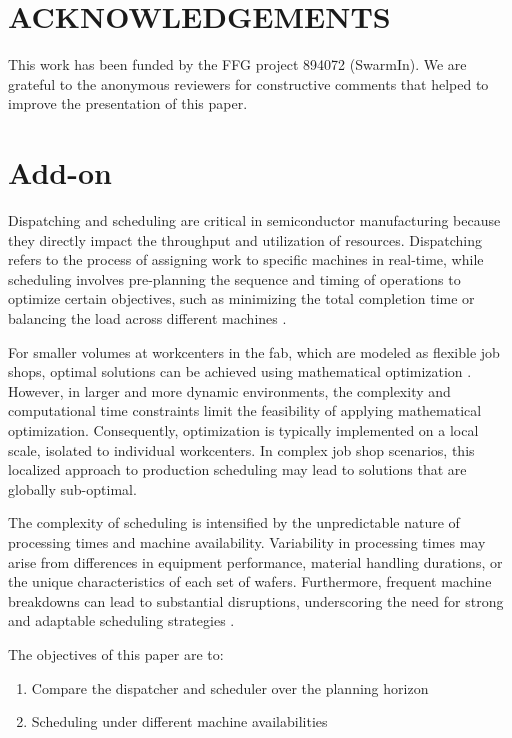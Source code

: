 \documentclass[runningheads]{llncs}
\begin{document}
\section*{ACKNOWLEDGEMENTS}

This work has been funded by the FFG project 894072 (SwarmIn).
We are grateful to the anonymous reviewers for constructive 
comments that helped to improve the presentation of this paper.

\section{Add-on}
Dispatching and scheduling are critical in semiconductor manufacturing because they directly impact the throughput and utilization of resources. Dispatching refers to the process of assigning work to specific machines in real-time, while scheduling involves pre-planning the sequence and timing of operations to optimize certain objectives, such as minimizing the total completion time or balancing the load across different machines \cite{schumann2022scheduling}.

For smaller volumes at workcenters in the fab, which are modeled as flexible job shops, optimal solutions can be achieved using mathematical optimization \cite{waschneck2018deep}. However, in larger and more dynamic environments, the complexity and computational time constraints limit the feasibility of applying mathematical optimization. Consequently, optimization is typically implemented on a local scale, isolated to individual workcenters. In complex job shop scenarios, this localized approach to production scheduling may lead to solutions that are globally sub-optimal.

The complexity of scheduling is intensified by the unpredictable nature of processing times and machine availability. Variability in processing times may arise from differences in equipment performance, material handling durations, or the unique characteristics of each set of wafers. Furthermore, frequent machine breakdowns can lead to substantial disruptions, underscoring the need for strong and adaptable scheduling strategies \cite{leachman1996benchmarking}.


The objectives of this paper are to:
\begin{enumerate}
	\item Compare the dispatcher and scheduler over the planning horizon 
	\item Scheduling under different machine availabilities
\end{enumerate}
\end{document}
